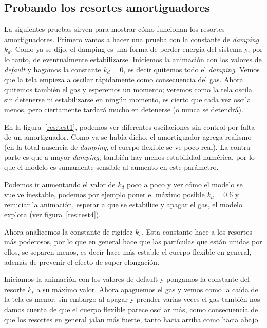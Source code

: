 \subsection{Probando los resortes amortiguadores}
La siguientes pruebas sirven para mostrar cómo funcionan los resortes amortiguadores.
Primero vamos a hacer una prueba con la constante de \emph{\foreignlanguage{english}{damping}} $k_d$.
Como ya se dijo, el damping es una forma de perder energía del sistema y, por lo tanto, de eventualmente estabilizarse.
Iniciemos la animación con los valores de \emph{\foreignlanguage{english}{default}} y hagamos la constante $k_d=0$, es decir quitemos todo el \emph{\foreignlanguage{english}{damping}}.
Vemos que la tela empieza a oscilar rápidamente como consecuencia del gas.
Ahora quitemos también el gas y esperemos un momento; veremos como la tela oscila sin detenerse ni estabilizarse en ningún momento, es cierto que cada vez oscila menos, pero ciertamente tardará mucho en detenerse (o nunca se detendrá).

En la figura~\ref{res:test1}, podemos ver diferentes oscilaciones sin control por falta de un amortiguador.
Como ya se había dicho, el amortiguador agrega realismo (en la total ausencia de \emph{\foreignlanguage{english}{damping}}, el cuerpo flexible se ve poco real). La contra parte es que a mayor \emph{\foreignlanguage{english}{damping}}, también hay menos estabilidad numérica, por lo que el modelo es sumamente sensible al aumento en este parámetro.

Podemos ir aumentando el valor de $k_d$ poco a poco y ver cómo el modelo se vuelve inestable, podemos por ejemplo poner el máximo posible $k_d=$0.6 y reiniciar la animación, esperar a que se estabilice y apagar el gas, el modelo explota (ver figura~\ref{res:test4}).

Ahora analicemos la constante de rigidez $k_s$.
Esta constante hace a los resortes más poderosos, por lo que en general hace que las partículas que están unidas por ellos, se separen menos, es decir hace más estable el cuerpo flexible en general, además de prevenir el efecto de super elongación.

Iniciamos la animación con los valores de default y pongamos la constante del resorte $k_s$ a su máximo valor.
Ahora apaguemos el gas y vemos como la caída de la tela es menor, sin embargo al apagar y prender varias veces el gas también nos damos cuenta de que el cuerpo flexible parece oscilar más, como consecuencia de que los resortes en general jalan más fuerte, tanto hacia arriba como hacia abajo.

